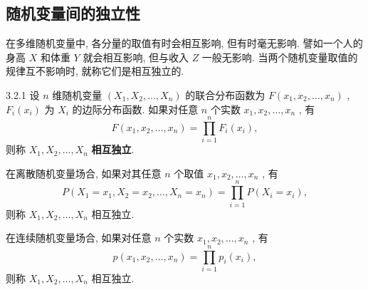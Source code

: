    \subsection{随机变量间的独立性}\label{ssec:3.2.4}
   在多维随机变量中, 各分量的取值有时会相互影响, 但有时毫无影响. 譬如一个人的身高 $X$ 和体重 $Y$ 就会相互影响, 但与收入 $Z$ 一般无影响. 当两个随机变量取值的规律互不影响时, 就称它们是相互独立的.
   \begin{definition}{}{3.2.1}
   	设 $n$ 维随机变量 $(X_1,X_2,\ldots,X_n)$ 的联合分布函数为 $F(x_1,x_2,\ldots,x_n)$ , $F_i(x_i)$ 为 $X_i$ 的边际分布函数. 如果对任意 $n$ 个实数 $x_1,x_2,\ldots,x_n$ , 有
   	\begin{equation}\label{eq:3.2.7}
   		F(x_1,x_2,\ldots,x_n)=\prod_{i=1}^{n}F_i(x_i),
   	\end{equation}
   	则称 $X_1,X_2,\ldots,X_n$ \textbf{相互独立}.
   \end{definition}
   在离散随机变量场合, 如果对其任意 $n$ 个取值 $x_1,x_2,\ldots,x_n$ , 有
   \begin{equation}\label{eq:3.2.8}
   	P(X_1=x_1,X_2=x_2,\ldots,X_n=x_n)=\prod_{i=1}^{n}P(X_i=x_i),
   \end{equation}
   则称 $X_1,X_2,\ldots,X_n$ 相互独立.

   在连续随机变量场合, 如果对任意 $n$ 个实数 $x_1,x_2,\ldots,x_n$ , 有
   \begin{equation}\label{eq:3.2.9}
   	p(x_1,x_2,\ldots,x_n)=\prod_{i=1}^{n}p_i(x_i),
   \end{equation}
   则称 $X_1,X_2,\ldots,X_n$ 相互独立.

